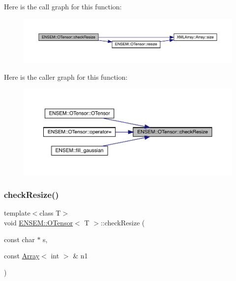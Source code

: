 Here is the call graph for this function\+:
\nopagebreak
\begin{figure}[H]
\begin{center}
\leavevmode
\includegraphics[width=350pt]{da/d8a/classENSEM_1_1OTensor_aa273eae7f1de4b37e91302da5edf279b_cgraph}
\end{center}
\end{figure}
Here is the caller graph for this function\+:\nopagebreak
\begin{figure}[H]
\begin{center}
\leavevmode
\includegraphics[width=350pt]{da/d8a/classENSEM_1_1OTensor_aa273eae7f1de4b37e91302da5edf279b_icgraph}
\end{center}
\end{figure}
\mbox{\label{classENSEM_1_1OTensor_aa273eae7f1de4b37e91302da5edf279b}} 
\subsubsection{\texorpdfstring{checkResize()}{checkResize()}\hspace{0.1cm}{\footnotesize\ttfamily [2/4]}}
{\footnotesize\ttfamily template$<$class T$>$ \\
void \mbox{\hyperlink{classENSEM_1_1OTensor}{E\+N\+S\+E\+M\+::\+O\+Tensor}}$<$ T $>$\+::check\+Resize (\begin{DoxyParamCaption}\item[{const char $\ast$}]{s,  }\item[{const \mbox{\hyperlink{classXMLArray_1_1Array}{Array}}$<$ int $>$ \&}]{n1 }\end{DoxyParamCaption})\hspace{0.3cm}{\ttfamily [inline]}}

